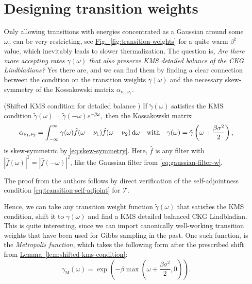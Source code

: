 \smallskip
\label{sec:ckg-transition-weights}
\section{Designing transition weights}
Only allowing transitions with energies concentrated as a Gaussian around some $\omega_\gamma$ can be very restricting, see \hyperref[fig:transition-weights]{Fig.~\ref*{fig:transition-weights}} for a quite warm $\beta^\sharp$ value, which inevitably leads to slower thermalization. The question is, \textit{Are there more accepting rates $\gamma(\omega)$ that also preserve KMS detailed balance of the CKG Lindbladians?} Yes there are, and we can find them by finding a clear connection between the condition on the transition weights $\gamma(\omega)$ and the necessary skew-symmetry of the Kossakowski matrix $\alpha_{\nu_1, \nu_2}$.
\begin{lemma} \label{lem:shifted-kms-condition}
    \textup{(Shifted KMS condition for detailed balance \cite{ramkumar2024mixing})} If $\tilde{\gamma}(\omega)$ satisfies the KMS condition $\tilde{\gamma}(\omega) = \tilde{\gamma}(-\omega)e^{-\beta \omega},$ then the Kossakowski matrix 
    $$
    \alpha_{\nu_1, \nu_2} = \int_{-\infty}^\infty \gamma(\omega) \hat{f}(\omega - \nu_1) \hat{f}(\omega - \nu_2) \mathop{}\!\mathrm{d} \omega \quad\textup{with}\quad \gamma(\omega) = \tilde{\gamma}\left(\omega + \frac{\beta \sigma^2}{2}\right),
    $$
    is skew-symmetric by \eqref{eq:skew-symmetry}. Here, $\hat{f}$ is any filter with $|\hat{f}(\omega)|^2 = |\hat{f}(-\omega)|^2$, like the Gaussian filter from \eqref{eq:gaussian-filter-w}.
\end{lemma}
\noindent The proof from the authors follows by direct verification of the self-adjointness condition \eqref{eq:transition-self-adjoint} for $\mathcal{T}$. 

Hence, we can take any transition weight function $\tilde{\gamma}(\omega)$ that satisfies the KMS condition, shift it to $\gamma(\omega)$ and find a KMS detailed balanced CKG Lindbladian. This is quite interesting, since we can import canonically well-working transition weights that have been used for Gibbs sampling in the past. One such function, is the \textit{Metropolis function}, which takes the following form after the prescribed shift from \hyperref[lem:shifted-kms-condition]{Lemma~\ref*{lem:shifted-kms-condition}}: 
\begin{equation} \label{eq:shifted-metro-func}
    \gamma_\text{M}(\omega)= \exp\left(-\beta \max\left(\omega + \frac{\beta\sigma^2}{2}, 0\right)\right).
\end{equation}

